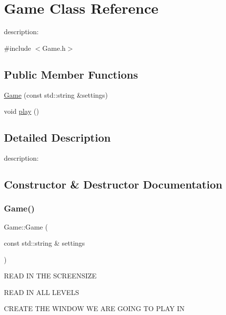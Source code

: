 \hypertarget{classGame}{}\section{Game Class Reference}
\label{classGame}


description\+:  




{\ttfamily \#include $<$Game.\+h$>$}

\subsection*{Public Member Functions}
\begin{DoxyCompactItemize}
\item 
\hyperlink{classGame_ae84079995ee22675be0adfbaa54940d9}{Game} (const std\+::string \&settings)
\item 
void \hyperlink{classGame_aa333825d0bca80e91e53c7e23f053405}{play} ()
\end{DoxyCompactItemize}


\subsection{Detailed Description}
description\+: 

\subsection{Constructor \& Destructor Documentation}
\mbox{\label{classGame_ae84079995ee22675be0adfbaa54940d9}} 
\subsubsection{\texorpdfstring{Game()}{Game()}}
{\footnotesize\ttfamily Game\+::\+Game (\begin{DoxyParamCaption}\item[{const std\+::string \&}]{settings }\end{DoxyParamCaption})\hspace{0.3cm}{\ttfamily [explicit]}}

R\+E\+AD IN T\+HE S\+C\+R\+E\+E\+N\+S\+I\+ZE

R\+E\+AD IN A\+LL L\+E\+V\+E\+LS

C\+R\+E\+A\+TE T\+HE W\+I\+N\+D\+OW WE A\+RE G\+O\+I\+NG TO P\+L\+AY IN 


